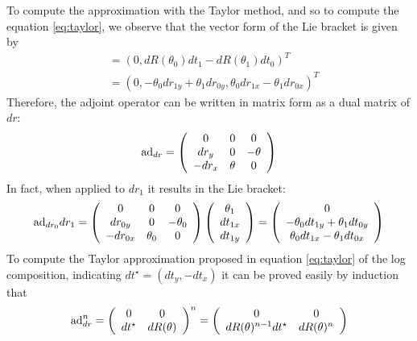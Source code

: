 To compute the approximation with the Taylor method, and so to compute the equation \ref{eq:taylor}, we observe that the vector form of the Lie bracket is given by
\begin{align*}
[dr_0, dr_1] &= (0, dR(\theta_0)dt_1 - dR(\theta_1)dt_0)^T \\
& = (0, -\theta_0 dr_{1y} + \theta_1 dr_{0y} ,  \theta_0 dr_{1x} - \theta_1 dr_{0x})^T
\end{align*} 
Therefore, the adjoint operator can be written in matrix form as a dual matrix of $dr$:
\begin{align*}
\text{ad}_{dr} = 
\left (
\begin{array} {c c c}
0            &  0        &      0\\
dr_y       &  0        & - \theta \\
- dr_x   & \theta &  0
\end{array}
\right )
\end{align*} 
In fact, when applied to $dr_1$ it results in the Lie bracket:
\begin{align*}
\text{ad}_{dr_0} dr_1= 
\left (
\begin{array} {c c c}
0            &  0        &      0\\
dr_{0y}       &  0        & - \theta_0 \\
- dr_{0x}   & \theta_0 &  0
\end{array}
\right )
\left (
\begin{array} {c }
\theta_1   \\
dt_{1x}    \\
dt_{1y}  
\end{array}
\right )
=
\left (
\begin{array} {c }
0  \\
-\theta_0 dt_{1y} + \theta_1 dt_{0y} \\ 
 \theta_0 dt_{1x} - \theta_1 dt_{0x} 
\end{array}
\right )
\end{align*} 
To compute the Taylor approximation proposed in equation \ref{eq:taylor} of the log composition, indicating $dt^{\star} = (dt_{y}, - dt_{x})$ it can be proved easily by induction that
\begin{align*}
\text{ad}_{dr}^{n} 
= 
\left (
\begin{array} {c c}
0            &  0        \\
dt^{\star}      &  dR(\theta)      
\end{array}
\right )^n
=
\left (
\begin{array} {c c}
0            &  0        \\
dR(\theta)^{n-1}dt^{\star}      &  dR(\theta)^{n}      
\end{array}
\right )
\end{align*}
